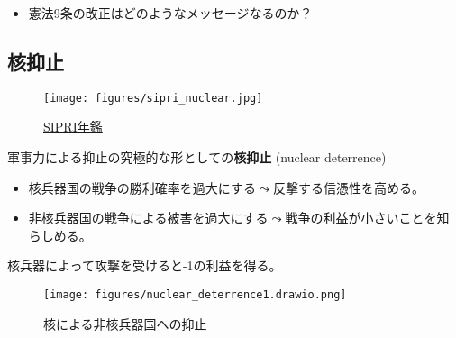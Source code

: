 \documentclass[
  xelatex,
  ja=standard]{bxjsarticle}
\providecommand{\tightlist}{%
  \setlength{\itemsep}{0pt}\setlength{\parskip}{0pt}}\usepackage{longtable,booktabs,array}
\begin{document}
\begin{itemize}
\tightlist
\item
  憲法9条の改正はどのようなメッセージなるのか？
\end{itemize}

\hypertarget{ux6838ux6291ux6b62}{%
\subsection{核抑止}\label{ux6838ux6291ux6b62}}

\begin{figure}[htpb]

{\centering \texttt{[image: figures/sipri\_nuclear.jpg]}

}

\caption{\href{https://www.sipri.org/yearbook/2022/10}{SIPRI年鑑}}

\end{figure}

軍事力による抑止の究極的な形としての\textbf{核抑止} (nuclear deterrence)

\begin{itemize}
\tightlist
\item
  核兵器国の戦争の勝利確率を過大にする\(\leadsto\)反撃する信憑性を高める。
\item
  非核兵器国の戦争による被害を過大にする\(\leadsto\)戦争の利益が小さいことを知らしめる。
\end{itemize}

\begin{tcolorbox}[enhanced jigsaw, colbacktitle=quarto-callout-tip-color!10!white, breakable, toptitle=1mm, opacitybacktitle=0.6, leftrule=.75mm, bottomrule=.15mm, title=\textcolor{quarto-callout-tip-color}{\faLightbulb}\hspace{0.5em}{核による非核兵器国への抑止}, titlerule=0mm, bottomtitle=1mm, rightrule=.15mm, arc=.35mm, toprule=.15mm, left=2mm, opacityback=0, coltitle=black, colback=white, colframe=quarto-callout-tip-color-frame]

核兵器によって攻撃を受けると-1の利益を得る。

\end{tcolorbox}

\begin{figure}[htpb]

{\centering \texttt{[image: figures/nuclear\_deterrence1.drawio.png]}

}

\caption{核による非核兵器国への抑止}

\end{figure}
\end{document}
